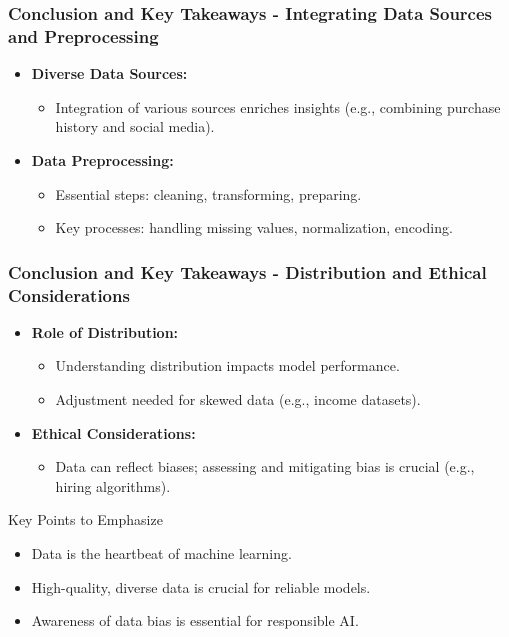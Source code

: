 \documentclass[aspectratio=169]{beamer}
\begin{document}
\begin{frame}[fragile]
    \frametitle{Conclusion and Key Takeaways - Integrating Data Sources and Preprocessing}
    \begin{itemize}
        \item \textbf{Diverse Data Sources:} 
            \begin{itemize}
                \item Integration of various sources enriches insights (e.g., combining purchase history and social media).
            \end{itemize}
        \item \textbf{Data Preprocessing:}
            \begin{itemize}
                \item Essential steps: cleaning, transforming, preparing.
                \item Key processes: handling missing values, normalization, encoding.
            \end{itemize}
    \end{itemize}
\end{frame}

\begin{frame}[fragile]
    \frametitle{Conclusion and Key Takeaways - Distribution and Ethical Considerations}
    \begin{itemize}
        \item \textbf{Role of Distribution:} 
            \begin{itemize}
                \item Understanding distribution impacts model performance.
                \item Adjustment needed for skewed data (e.g., income datasets).
            \end{itemize}
        \item \textbf{Ethical Considerations:} 
            \begin{itemize}
                \item Data can reflect biases; assessing and mitigating bias is crucial (e.g., hiring algorithms).
            \end{itemize}
    \end{itemize}
    \begin{block}{Key Points to Emphasize}
        \begin{itemize}
            \item Data is the heartbeat of machine learning.
            \item High-quality, diverse data is crucial for reliable models.
            \item Awareness of data bias is essential for responsible AI.
        \end{itemize}
    \end{block}
\end{frame}
\end{document}
